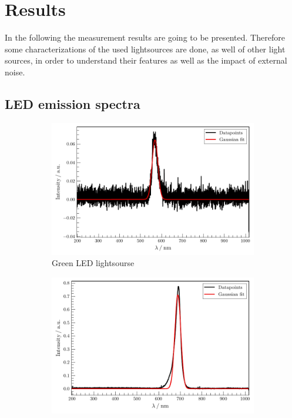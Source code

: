 

\section{Results}
\label{sec:Results}

In the following the measurement results are going to be presented. 
Therefore some characterizations of the used lightsources are done, as well of other light sources, in order to understand their features as well as the impact of external noise.
\subsection{LED emission spectra}
\label{sec:LED}
\begin{figure}
    \centering
\begin{subfigure}{.3\textwidth}
    \centering
    \includegraphics[width=\textwidth]{plots/LED-Green.pdf}
    \caption{Green LED lightsourse}
    \label{fig:LEDG}
\end{subfigure}
\begin{subfigure}{.3\textwidth}
    \centering
    \includegraphics[width=\textwidth]{plots/LED-Red.pdf}

\end{subfigure}
\end{figure}
